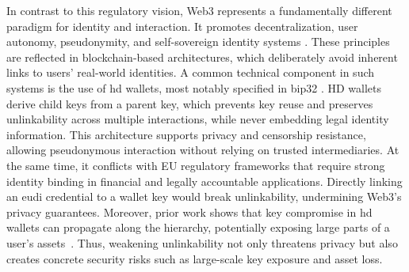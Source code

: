 In contrast to this regulatory vision, Web3 represents a fundamentally different paradigm for identity and interaction. It promotes decentralization, user autonomy, pseudonymity, and self-sovereign identity systems \cite{bambacht2022web3}. These principles are reflected in blockchain-based architectures, which deliberately avoid inherent links to users’ real-world identities. A common technical component in such systems is the use of \acrfull{hd} wallets, most notably specified in \acrfull{bip32} \cite{bip32, Das2019, narayanan2016bitcoin}. HD wallets derive child keys from a parent key, which prevents key reuse and preserves unlinkability across multiple interactions, while never embedding legal identity information. This architecture supports privacy and censorship resistance, allowing pseudonymous interaction without relying on trusted intermediaries. At the same time, it conflicts with EU regulatory frameworks that require strong identity binding in financial and legally accountable applications. Directly linking an \acrshort{eudi} credential to a wallet key would break unlinkability, undermining Web3’s privacy guarantees. Moreover, prior work shows that key compromise in \acrshort{hd} wallets can propagate along the hierarchy, potentially exposing large parts of a user’s assets~\cite{Das2019}. Thus, weakening unlinkability not only threatens privacy but also creates concrete security risks such as large-scale key exposure and asset loss.

